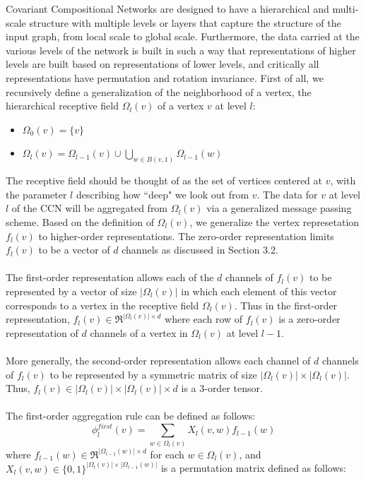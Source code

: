 \documentclass[a4paper]{article}
\begin{document}
Covariant Compositional Networks are designed to have a hierarchical and multi-scale structure with multiple levels or layers that capture the structure of the input graph, from local scale to global scale. Furthermore, the data carried at the various levels of the network is built in such a way that representations of higher levels are built based on representations of lower levels, and critically all representations have permutation and rotation invariance. First of all, we recursively define a generalization of the neighborhood of a vertex, the hierarchical receptive field $\Omega_l(v)$ of a vertex $v$ at level $l$:
\begin{itemize}
	\item $\Omega_0(v) = \{v\}$
	\item $\Omega_l(v) = \Omega_{l - 1}(v) \cup \bigcup_{w \in B(v, 1)} \Omega_{l - 1}(w)$
\end{itemize} 
The receptive field should be thought of as the set of vertices centered at $v$, with the parameter $l$ describing how ``deep" we look out from $v$. The data for $v$ at level $l$ of the CCN will be aggregated from $\Omega_l(v)$ via a generalized message passing scheme. Based on the definition of $\Omega_l(v)$, we generalize the vertex represetation $f_l(v)$ to higher-order representations. The zero-order representation limits $f_l(v)$ to be a vector of $d$ channels as discussed in Section 3.2. \\ \\
The first-order representation allows each of the $d$ channels of $f_l(v)$ to be represented by a vector of size $|\Omega_l(v)|$ in which each element of this vector corresponds to a vertex in the receptive field $\Omega_l(v)$. Thus in the first-order representation, $f_l(v) \in \Re^{|\Omega_l(v)| \times d}$ where each row of $f_l(v)$ is a zero-order representation of $d$ channels of a vertex in $\Omega_{l}(v)$ at level $l - 1$. \\ \\
More generally, the second-order representation allows each channel of $d$ channels of $f_l(v)$ to be represented by a symmetric matrix of size $|\Omega_l(v)| \times |\Omega_l(v)|$. Thus, $f_l(v) \in |\Omega_l(v)| \times |\Omega_l(v)| \times d$ is a 3-order tensor. \\ \\
The first-order aggregation rule can be defined as follows:
$$\phi_l^{first}(v) = \sum\limits_{w \in \Omega_l(v)} X_l(v, w) f_{l - 1}(w)$$
where $f_{l - 1}(w) \in \Re^{|\Omega_{l - 1}(w)| \times d}$ for each $w \in \Omega_l(v)$, and $X_l(v, w) \in \{0, 1\}^{|\Omega_l(v)| \times |\Omega_{l - 1}(w)|}$ is a permutation matrix defined as follows:
\end{document}

